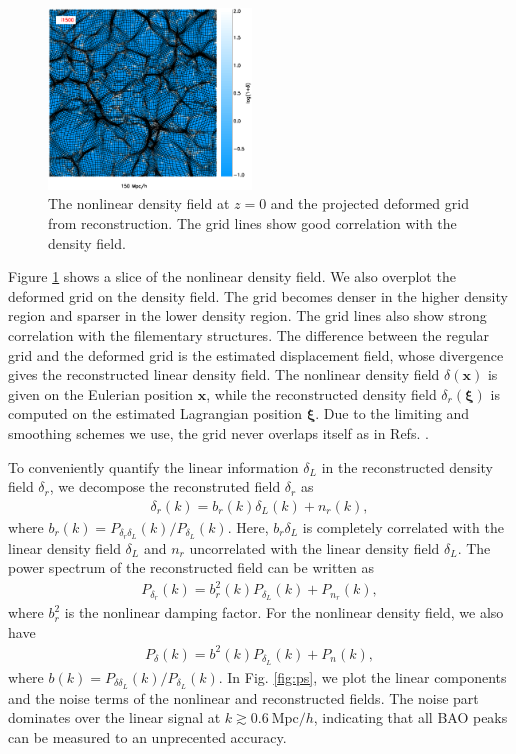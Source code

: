 \documentclass[aps,prd,twocolumn,superscriptaddress,groupedaddress,nofootinbib]{revtex4}  %
\newcommand{\mr}{\mathrm}
\newcommand{\bea}{\begin{eqnarray}}
\newcommand{\eea}{\end{eqnarray}}
\begin{document}
\begin{figure}[tbp]
\begin{center}
\includegraphics[width=0.48\textwidth]{map0512-0128_i1500_.eps}
\end{center}
\vspace{-0.7cm}
\caption{The nonlinear density field at $z=0$ and the projected deformed grid 
from reconstruction. The grid lines show good correlation with the density 
field.}
\label{fig:den}
\end{figure}

Figure \ref{fig:den} shows a slice of the nonlinear density field. 
We also overplot the deformed grid on the density field. The grid becomes 
denser in the higher density region and sparser in the lower density region.
The grid lines also show strong correlation with the filementary structures.
The difference between the regular grid and the deformed grid is the estimated
displacement field, whose divergence gives the reconstructed linear density 
field. The nonlinear density field $\delta(\bm{x})$ is given on the Eulerian 
position $\bm{x}$, while the reconstructed density field $\delta_r(\bm{\xi})$ 
is computed on the estimated Lagrangian position $\bm{\xi}$. Due to the 
limiting and smoothing schemes we use, the grid never overlaps itself as in 
Refs. \cite{1995ApJS..100..269P,1998ApJS..115...19P}.

To conveniently quantify the linear information $\delta_L$ in the reconstructed
density field $\delta_r$, we decompose the reconstruted field $\delta_r$ as
\bea
\delta_r(k)=b_r(k)\delta_L(k)+n_r(k),
\eea
where $b_r(k)=P_{\delta_r\delta_L}(k)/P_{\delta_L}(k)$. 
Here, $b_r\delta_L$ is completely correlated with the linear density field 
$\delta_L$ and $n_r$ uncorrelated with the linear density field $\delta_L$.
The power spectrum of the reconstructed field can be written as
\bea
P_{\delta_r}(k)=b_r^2(k)P_{\delta_L}(k)+P_{n_r}(k),
\eea
where $b_r^2$ is the nonlinear damping factor. 
For the nonlinear density field, we also have
\bea
P_{\delta}(k)=b^2(k)P_{\delta_L}(k)+P_{n}(k),
\eea
where $b(k)=P_{\delta\delta_L}(k)/P_{\delta_L}(k)$. 
In Fig. \ref{fig:ps}, we plot the linear components and the noise terms of the
nonlinear and reconstructed fields. The noise part dominates over the linear 
signal at $k\gtrsim0.6\ \mr{Mpc}/h$, indicating that all BAO peaks can be 
measured to an unprecented accuracy.
\end{document}
